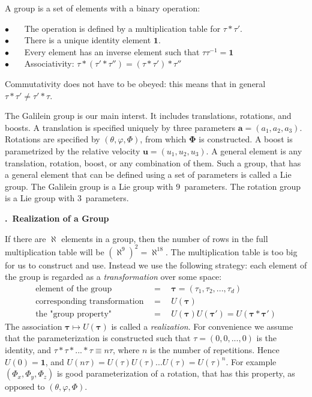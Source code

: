 \documentclass[onecolumn,fleqn, 11pt]{revtex4}
\newcommand{\bitem}{$\bullet$ \ \ \ }
\newcommand{\beq}{\begin{eqnarray}}
\newcommand{\eeq}{\end{eqnarray}}
\renewcommand{\thesubsection}{\arabic{subsection}}
\renewcommand{\thesubsubsection}{\arabic{subsubsection}}
\newcommand{\sheadC}[1]
{
\addtocounter{subsubsection}{1}
\vspace{5mm}
{\bf \thesubsection.\thesubsubsection \ #1}  
\nopagebreak
\phantomsection
}
\begin{document}
A group is a set of elements with a binary operation: 

\bitem The operation is defined by a multiplication table for ${\tau* \tau'}$. \\
\bitem There is a unique identity element ${\mathbf{1}}$. \\
\bitem Every element has an inverse element such that ${\tau \tau^{-1}=\mathbf{1}}$ \\
\bitem Associativity: ${\tau *(\tau'*\tau'') = (\tau*\tau')*\tau''}$

Commutativity does not have to be obeyed:  
this means that in general ${\tau *\tau'\neq\tau'*\tau}$. 

The Galilein group is our main interst. It includes translations, rotations, and boosts. 
A translation is specified uniquely by three parameters ${\mathbf{a}=(a_1,a_2,a_3)}$. 
Rotations are specified by ${(\theta,\varphi,\Phi)}$, 
from which ${\mathbf{\Phi}}$ is constructed.
A boost is parametrized by the relative velocity ${\mathbf{u}=(u_1,u_2,u_3)}$.
A general element is any translation, rotation, boost, or any combination of them. 
Such a group, that has a general element that can be defined using 
a set of parameters is called a Lie group. 
The Galilein group is a Lie group with $9$~parameters. 
The rotation group is a Lie group with $3$~parameters. 


 
\sheadC{Realization of a Group} 

If there are ${\aleph}$ elements in a group, 
then the number of rows in the full multiplication 
table will be ${(\aleph^9)^2=\aleph^{18}}$. 
The multiplication table is too big for us 
to construct and use. Instead we use the following 
strategy: each element of the group 
is regarded as a {\em transformation} over some space:
\beq
\mbox{element of the group} \ \ &=& \ \ \bm{\tau} = (\tau_1,\tau_2, ... ,\tau_d) \\
\mbox{corresponding transformation} \ \ &=& \ \ U(\bm{\tau}) \\
\mbox{the "group property"} \ \ &=& \ \ U(\bm{\tau}) U(\bm{\tau}') =  U(\bm{\tau}*\bm{\tau}') 
\eeq
The association $\bm{\tau}\mapsto U(\bm{\tau})$ is called a {\em realization}. 
For convenience we assume that the parameterization is constructed 
such that ${\tau=(0,0,...,0)}$ is the identity,  
and $\tau*\tau*...*\tau \equiv n\tau$, 
where $n$ is the number of repetitions. 
Hence ${U(0)=\bm{1}}$, and ${U(n\tau)=U(\tau)U(\tau)...U(\tau) = U(\tau)^n}$. 
For example $(\Phi_x,\Phi_y,\Phi_z)$ is good parameterization of 
a rotation, that has this property, as opposed to $(\theta,\varphi,\Phi)$.  
\end{document}
